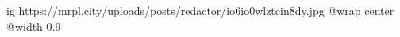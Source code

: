 
 
 
 
 

\ifcmt
  ig https://mrpl.city/uploads/posts/redactor/io6io0wlztcin8dy.jpg
  @wrap center
  @width 0.9
\fi
